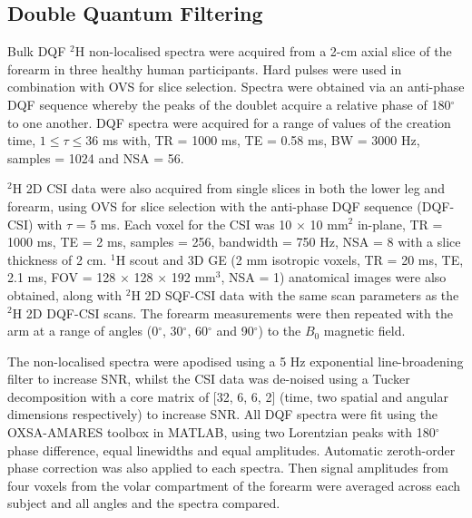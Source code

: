 \subsection{Double Quantum Filtering}

Bulk \ac{DQF} $^2$H non-localised spectra were acquired from a 2-cm axial slice of the forearm in three healthy human participants. Hard pulses were used in combination with \ac{OVS} for slice selection. Spectra were obtained via an anti-phase \ac{DQF} sequence \cite{Sharf1995DetectionNMR-Spectroscopy} whereby the peaks of the doublet acquire a relative phase of 180$^\circ$ to one another. \ac{DQF} spectra were acquired for a range of values of the creation time, $1\leq\tau\leq36$ ms with, \ac{TR} = 1000 ms, \ac{TE} = 0.58 ms, \ac{BW} = 3000 Hz, samples = 1024 and NSA = 56.

$^2$H 2D \ac{CSI} data were also acquired from single slices in both the lower leg and forearm, using \ac{OVS} for slice selection with the anti-phase \ac{DQF} sequence (\ac{DQF}-\ac{CSI}) with $\tau$ = 5 ms. Each voxel for the \ac{CSI} was 10 $\times$ 10 mm$^2$ in-plane, \ac{TR} = 1000 ms, \ac{TE} = 2 ms, samples = 256, bandwidth = 750 Hz, NSA = 8 with a slice thickness of 2 cm. $^1$H scout and 3D \ac{GE} (2 mm isotropic voxels, \ac{TR} = 20 ms, \ac{TE}, 2.1 ms, \ac{FOV} = 128 $\times$ 128 $\times$ 192 mm$^3$, NSA = 1) anatomical images were also obtained, along with $^2$H 2D \ac{SQF}-\ac{CSI} data with the same scan parameters as the $^2$H 2D \ac{DQF}-\ac{CSI} scans. The forearm measurements were then repeated with the arm at a range of angles (0$^\circ$, 30$^\circ$, 60$^\circ$ and 90$^\circ$) to the $B_0$ magnetic field. 

The non-localised spectra were apodised using a 5 Hz exponential line-broadening filter to increase \ac{SNR}, whilst the \ac{CSI} data was de-noised using a Tucker decomposition \cite{Bader2007EfficientTensors} with a core matrix of [32, 6, 6, 2] (time, two spatial and angular dimensions respectively) to increase \ac{SNR}. All \ac{DQF} spectra were fit using the OXSA-AMARES \cite{Purvis2017OXSA:MATLAB} toolbox in MATLAB, using two Lorentzian peaks with 180$^\circ$ phase difference, equal linewidths and equal amplitudes. Automatic zeroth-order phase correction was also applied to each spectra. Then signal amplitudes from four voxels from the volar compartment of the forearm were averaged across each subject and all angles and the spectra compared.

